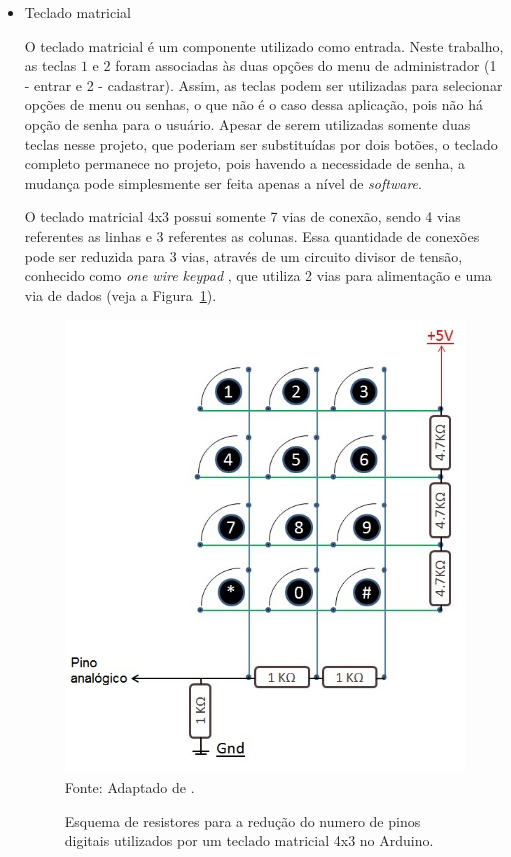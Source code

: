 \begin{itemize}
    \item Teclado matricial
    
    O teclado matricial é um componente utilizado como entrada. Neste trabalho, as teclas $1$ e $2$ foram associadas às duas opções do menu de administrador (1 - entrar e 2 - cadastrar). Assim, as teclas podem ser utilizadas para selecionar opções de menu ou senhas, o que não é o caso dessa aplicação, pois não há opção de senha para o usuário. Apesar de serem utilizadas somente duas teclas nesse projeto, que poderiam ser substituídas por dois botões, o teclado completo permanece no projeto, pois havendo a necessidade de senha, a mudança pode simplesmente ser feita apenas a nível de \textit{software}. 
    
    O teclado matricial 4x3 possui somente 7 vias de conexão, sendo 4 vias referentes as linhas e 3 referentes as colunas. Essa quantidade de conexões pode ser reduzida para 3 vias, através de um circuito divisor de tensão, conhecido como \textit{one wire keypad} \cite{arduinocc_onewirekeypad}, que utiliza 2 vias para alimentação e uma via de dados (veja a Figura~\ref{onewirekeypad}).

    \begin{figure}[!t]
    \begin{center}
    \caption{Esquema de resistores para a redução do numero de pinos digitais utilizados por um teclado matricial 4x3 no Arduino.}
    \includegraphics[scale=0.55]{figuras/cap4/onewirekeypad.jpg}\\
    Fonte: Adaptado de \cite{arduinocc_onewirekeypad}.
    \label{onewirekeypad}
    \end{center}
    \end{figure}
    

\end{itemize}
